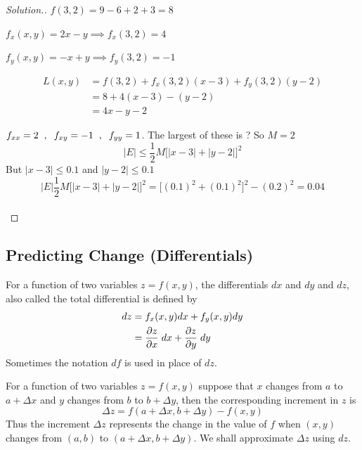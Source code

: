 \documentclass[11pt,a4paper]{article}
\theoremstyle{definition}
\newenvironment{solution}
  {\renewcommand{\qedsymbol}{}\begin{proof}[\textit{Solution}.]}
  {\end{proof}}
\begin{document}
\begin{solution}


$f(3,2) = 9 - 6 + 2 + 3 = 8$


$f_{x}(x,y) = 2x- y \implies f_x(3,2) = 4$


$f_y(x,y) = -x + y \implies f_y(3,2) = -1$

\begin{align*}
L(x,y) & = f(3,2) + f_x(3,2)(x-3) + f_y(3,2)(y-2)\\
& = 8 + 4(x-3) -(y - 2)\\
& = 4x -y -2
\end{align*} 

$f_{xx} = 2 \hspace{0.2cm} , \hspace{0.2cm} f_{xy} = -1 \hspace{0.2cm} , \hspace{0.2cm} f_{yy}= 1$. The largest of  these is ? So $M = 2$
$$\left|E\right|\leq \dfrac{1}{2}M\Big[\left|x - 3\right| + \left|y - 2\right|\Big]^2$$ But $\left|x - 3\right|\leq 0.1$ and $\left|y - 2\right|\leq 0.1$
$$\left|E\right|\dfrac{1}{2}M\Big[\left|x - 3\right| + \left|y - 2\right|\Big]^2 = \Big[(0.1)^2 + (0.1)^2\Big]^2 - (0.2)^2 = 0.04$$\\
\end{solution}

\subsection{Predicting Change (Differentials)}
For a function of two variables $z = f(x,y)$, the differentials $dx$ and $dy$ and $dz$, also called the total differential is defined by 
\begin{align*}
dz & = f_x(x,y) dx + f_y (x,y) dy\\
& = \frac{\partial z}{\partial x}\hspace{0.1cm}dx + \frac{\partial z}{\partial y}\hspace{0.1cm}dy
\end{align*}
Sometimes the notation $df$ is used in place of $dz$.


For a function of two variables $z = f(x,y)$ suppose that $x$ changes from $a$ to $a + \Delta x$ and $y$ changes from $b$ to $b + \Delta y$, then the corresponding increment in $z$ is $$\Delta z = f(a + \Delta x, b + \Delta y ) - f(x,y)$$ Thus the increment $\Delta z$ represents the change in the value of $f$ when $(x,y)$ changes from $(a,b)$ to $(a+ \Delta x, b + \Delta y)$. We shall approximate $\Delta z$ using $dz$.
\end{document}

